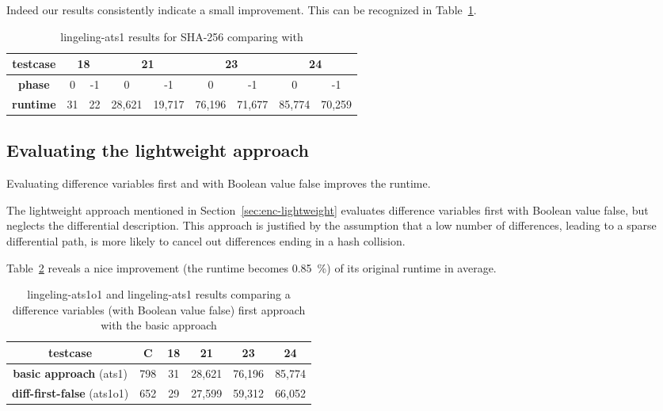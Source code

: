 Indeed our results consistently indicate a small improvement.
This can be recognized in Table~\ref{tab:phase-results}.

\begin{table}[!h]
  \begin{center}
    \begin{tabular}{c|cc cc cc cc}
      \textbf{testcase} & \multicolumn{2}{c}{18} & \multicolumn{2}{c}{21} & \multicolumn{2}{c}{23} & \multicolumn{2}{c}{24} \\
    \hline
      \textbf{phase}    &       0 &     -1 &       0 &     -1 &       0 &     -1 &       0 &     -1 \\
    \hline
      \textbf{runtime}  &      31 &     22 &  28,621 & 19,717 &  76,196 & 71,677 & 85,774  & 70,259 \\
    \end{tabular}
    \caption{lingeling-ats1 results for SHA-256 comparing \mone{} with \mone[0]{}}
    \label{tab:phase-results}
  \end{center}
\end{table}

\subsection{Evaluating the lightweight approach}
\label{sec:lightweight-results}
%
\begin{prop}
  Evaluating difference variables first and with Boolean value false improves the runtime.
\end{prop}
%
The lightweight approach mentioned in Section~\ref{sec:enc-lightweight}
evaluates difference variables first with Boolean value false,
but neglects the differential description.
This approach is justified by the assumption that a low number of differences,
leading to a sparse differential path, is more likely to cancel out differences
ending in a hash collision.

Table~\ref{tab:diff-first-false-results} reveals a nice improvement (the runtime
becomes 0.85~\%) of its original runtime in average.

\begin{table}[!h]
  \begin{center}
    \begin{tabular}{c|c|cccc}
      \textbf{testcase}                   & \textbf{C} & \textbf{18} & \textbf{21} & \textbf{23} & \textbf{24} \\
    \hline
      \textbf{basic approach}      (ats1) &        798 &          31 &      28,621 &      76,196 &      85,774 \\
      \textbf{diff-first-false}  (ats1o1) &        652 &          29 &      27,599 &      59,312 &      66,052
    \end{tabular}
    \caption[Difference variables first (with Boolean value false) results]{
      lingeling-ats1o1 and lingeling-ats1 results
      comparing a difference variables (with Boolean value false) first approach
      with the basic approach
    }
    \label{tab:diff-first-false-results}
  \end{center}
\end{table}


